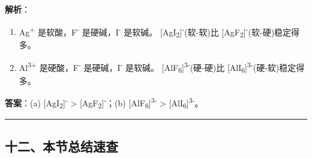 \textbf{解析}：

\begin{enumerate}
\def\labelenumi{(\alph{enumi})}
\item
  Ag\textsuperscript{+} 是软酸，F\textsuperscript{-} 是硬碱，I\textsuperscript{-} 是软碱。
  {[}AgI\textsubscript{2}{]}\textsuperscript{-}(软-软)比 {[}AgF\textsubscript{2}{]}\textsuperscript{-}(软-硬)稳定得多。
\item
  Al\textsuperscript{3+} 是硬酸，F\textsuperscript{-} 是硬碱，I\textsuperscript{-} 是软碱。
  {[}AlF\textsubscript{6}{]}\textsuperscript{3-}(硬-硬)比 {[}AlI\textsubscript{6}{]}\textsuperscript{3-}(硬-软)稳定得多。
\end{enumerate}

\textbf{答案}：(a) {[}AgI\textsubscript{2}{]}\textsuperscript{-} \textgreater{} {[}AgF\textsubscript{2}{]}\textsuperscript{-}；(b) {[}AlF\textsubscript{6}{]}\textsuperscript{3-} \textgreater{} {[}AlI\textsubscript{6}{]}\textsuperscript{3-}。

\begin{center}\rule{0.5\linewidth}{0.5pt}\end{center}

\subsection{十二、本节总结速查}\label{ux5341ux4e8cux672cux8282ux603bux7ed3ux901fux67e5}

